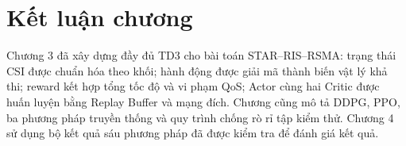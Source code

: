 \section{Kết luận chương}
Chương 3 đã xây dựng đầy đủ TD3 cho bài toán STAR--RIS--RSMA: trạng thái CSI được chuẩn hóa theo khối; hành động được giải mã thành biến vật lý khả thi; reward kết hợp tổng tốc độ và vi phạm QoS; Actor cùng hai Critic được huấn luyện bằng Replay Buffer và mạng đích. Chương cũng mô tả DDPG, PPO, ba phương pháp truyền thống và quy trình chống rò rỉ tập kiểm thử. Chương 4 sử dụng bộ kết quả sáu phương pháp đã được kiểm tra để đánh giá kết quả.
